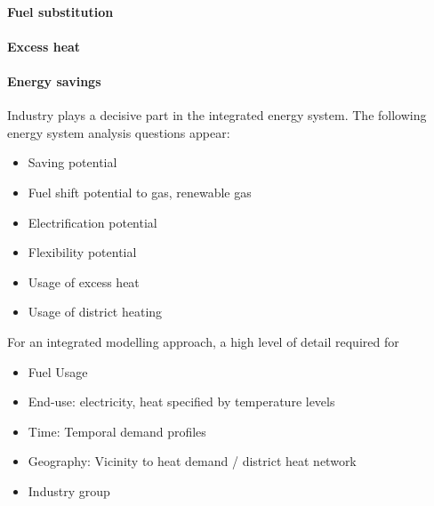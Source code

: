 \documentclass[review]{elsarticle}
\begin{document}
\paragraph{Fuel substitution}

\paragraph{Excess heat}

\paragraph{Energy savings}


Industry plays a decisive part in the integrated energy system. The following energy system analysis questions appear:
\begin{itemize}
    \item Saving potential
    \item Fuel shift potential to gas, renewable gas
    \item Electrification potential
    \item Flexibility potential
    \item Usage of excess heat
    \item Usage of district heating
\end{itemize}
For an integrated modelling approach, a high level of detail required for
\begin{itemize}
    \item Fuel Usage
    \item End-use: electricity, heat specified by temperature levels
    \item Time: Temporal demand profiles
    \item Geography: Vicinity to heat demand / district heat network
    \item Industry group
\end{itemize} 
\end{document}
